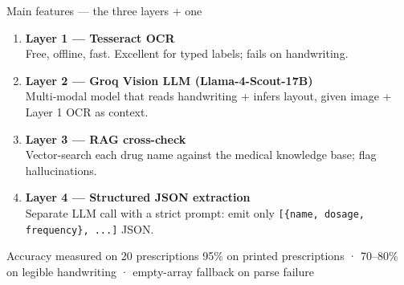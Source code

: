 \documentclass[aspectratio=169,11pt]{beamer}
\begin{document}
\begin{frame}{Main features --- the three layers + one}
  \begin{enumerate}
    \item \textbf{Layer 1 --- Tesseract OCR}\\
          {\small Free, offline, fast. Excellent for typed labels; fails on handwriting.}
    \item \textbf{Layer 2 --- Groq Vision LLM (Llama-4-Scout-17B)}\\
          {\small Multi-modal model that reads handwriting + infers layout, given image + Layer 1 OCR as context.}
    \item \textbf{Layer 3 --- RAG cross-check}\\
          {\small Vector-search each drug name against the medical knowledge base; flag hallucinations.}
    \item \alert{\textbf{Layer 4 --- Structured JSON extraction}}\\
          {\small Separate LLM call with a strict prompt: emit only \texttt{[\{name, dosage, frequency\}, ...]} JSON.}
  \end{enumerate}
  \vfill
  \begin{block}{Accuracy measured on 20 prescriptions}
    \small 95\% on printed prescriptions · 70--80\% on legible handwriting · empty-array fallback on parse failure
  \end{block}
\end{frame}
\end{document}
